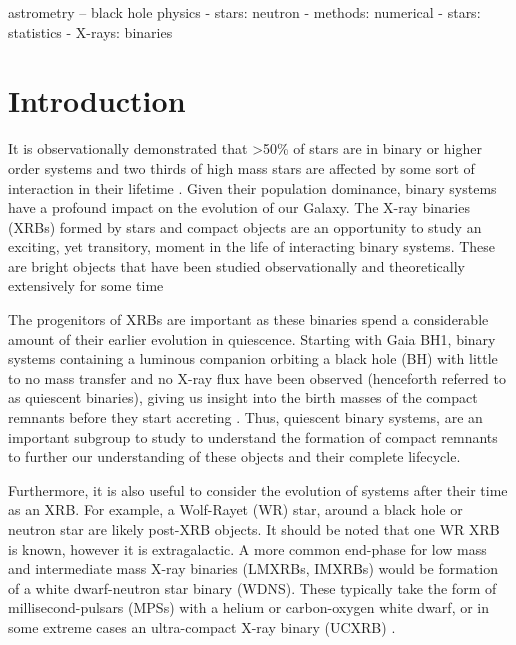 \documentclass{pas}
\begin{document}
\begin{keywords}
astrometry – black hole physics - stars: neutron - methods: numerical - stars: statistics - X-rays: binaries
\end{keywords}

\maketitle

\section{Introduction}\label{INTRO}

It is observationally demonstrated that \textgreater50\% of stars are in binary or higher order systems and two thirds of high mass stars are affected by some sort of interaction in their lifetime \citep{Sana2012, Ps&Qs}. Given their population dominance, binary systems have a profound impact on the evolution of our Galaxy. The X-ray binaries (XRBs) formed by stars and compact objects are an opportunity to study an exciting, yet transitory, moment in the life of interacting binary systems. These are bright objects that have been studied observationally and theoretically extensively for some time \citep{Corral_Santana_2016,2024MNRAS.527.5023L,2023ApJ...954..212S,2003ApJ...597.1036P,2005MNRAS.356..401R}

The progenitors of XRBs are important as these binaries spend a considerable amount of their earlier evolution in quiescence. Starting with Gaia BH1, binary systems containing a luminous companion orbiting a black hole (BH) with little to no mass transfer and no X-ray flux have been observed (henceforth referred to as quiescent binaries), giving us insight into the birth masses of the compact remnants before they start accreting \citep[e.g][]{El_Badry2023-1, 2024PASP..136a4202N}. Thus, quiescent binary systems, are an important subgroup to study to understand the formation of compact remnants to further our understanding of these objects and their complete lifecycle. 

Furthermore, it is also useful to consider the evolution of systems after their time as an XRB. For example, a Wolf-Rayet (WR) star, around a black hole or neutron star are likely post-XRB objects. It should be noted that one WR XRB is known, however it is extragalactic. A more common end-phase for low mass and intermediate mass X-ray binaries (LMXRBs, IMXRBs) would be formation of a white dwarf-neutron star binary (WDNS). These typically take the form of millisecond-pulsars (MPSs) with a helium or carbon-oxygen white dwarf, or in some extreme cases an ultra-compact X-ray binary (UCXRB) \citep{2002ApJ...565.1107P, 1988A&A...191...57P, 1989A&A...208...52P}.
\end{document}
